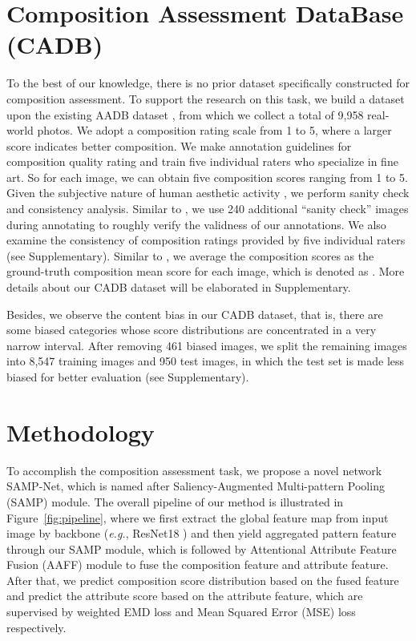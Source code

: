 \documentclass{bmvc2k}
\begin{document}
\section{Composition Assessment DataBase (CADB)}
\label{sec:dataset}
To the best of our knowledge, there is no prior dataset specifically constructed for composition assessment. To support the research on this task, we build a dataset upon the existing AADB dataset \cite{Kong2016PhotoAR}, from which we collect a total of 9,958 real-world photos. We adopt a composition rating scale from 1 to 5, where a larger score indicates better composition.  We make annotation guidelines for composition quality rating and train five individual raters who specialize in fine art.  So for each image, we can obtain five composition scores ranging from 1 to 5.
Given the subjective nature of human aesthetic activity \cite{savakis2000evaluation,Prakel2010TheFO,Freeman2007ThePE}, we perform sanity check and consistency analysis. Similar to \cite{Yu2018LearningTD}, we use 240 additional ``sanity check'' images during annotating to roughly verify the validness of our annotations. We also examine the consistency of composition ratings provided by five individual raters  (see Supplementary).  Similar to \cite{Murray2012AVAAL, Kong2016PhotoAR}, we average the composition scores as the ground-truth composition mean score for each image, which is denoted as . More details about our CADB dataset will be elaborated in Supplementary. 

 Besides, we observe the content bias in our CADB dataset, that is, there are some biased categories whose score distributions are concentrated in a very narrow interval. After removing 461 biased images, we split the remaining images into 8,547 training images and 950 test images, in which the test set is made less biased for better evaluation (see Supplementary).
 












\section{Methodology}
\label{sec:methodology}
To accomplish the composition assessment task, we propose a novel network SAMP-Net, which is named after Saliency-Augmented Multi-pattern Pooling (SAMP) module. The overall pipeline of our method is illustrated in Figure~\ref{fig:pipeline}, where we first extract the global feature map from input image by backbone (\emph{e.g.}, ResNet18 \cite{he2016deep}) and then yield aggregated pattern feature through our SAMP module, which is followed by Attentional Attribute Feature Fusion (AAFF) module to fuse the composition feature and attribute feature. After that, we predict composition score distribution based on the fused feature and predict the attribute score based on the attribute feature, which are supervised by weighted EMD loss and Mean Squared Error (MSE) loss respectively.
\end{document}
